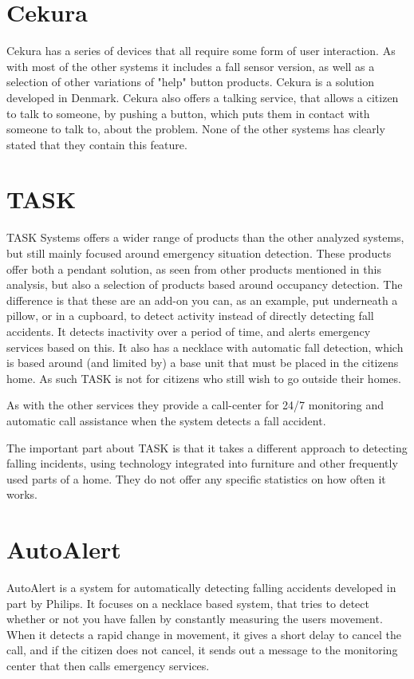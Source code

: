 \section{Cekura}
Cekura \cite{CekuraFald} has a series of devices that all require some form of user interaction. As with most of the other systems it includes a fall sensor version, as well as a selection of other variations of "help" button products. Cekura is a solution developed in Denmark. Cekura also offers a talking service, that allows a citizen to talk to someone, by pushing a button, which puts them in contact with someone to talk to, about the problem. None of the other systems has clearly stated that they contain this feature.

\section{TASK}\label{task}
TASK Systems offers a wider range of products than the other analyzed systems, but still mainly focused around emergency situation detection. These products offer both a pendant solution, as seen from other products mentioned in this analysis, but also a selection of products based around occupancy detection. The difference is that these are an add-on you can, as an example, put underneath a pillow, or in a cupboard, to detect activity instead of directly detecting fall accidents. It detects inactivity over a period of time, and alerts emergency services based on this. It also has a necklace with automatic fall detection, which is based around (and limited by) a base unit that must be placed in the citizens home. As such TASK is not for citizens who still wish to go outside their homes.

As with the other services they provide a call-center for 24/7 monitoring and automatic call assistance when the system detects a fall accident.

The important part about TASK is that it takes a different approach to detecting falling incidents, using technology integrated into furniture and other frequently used parts of a home. They do not offer any specific statistics on how often it works.

\section{AutoAlert}\label{sec:lifeLine} 
AutoAlert \cite{AAlert} is a system for automatically detecting falling accidents developed in part by Philips. It focuses on a necklace based system, that tries to detect whether or not you have fallen by constantly measuring the users movement. When it detects a rapid change in movement, it gives a short delay to cancel the call, and if the citizen does not cancel, it sends out a message to the monitoring center that then calls emergency services.

